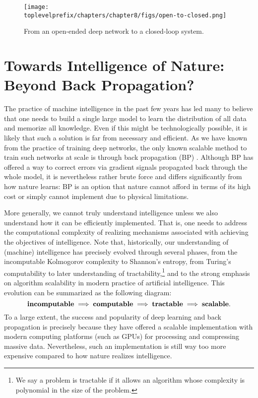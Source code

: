 \documentclass[\toplevelprefix/book-main.tex]{subfiles}
\begin{document}
\begin{figure}[t]
    \centering    
    \texttt{[image: \\toplevelprefix/chapters/chapter8/figs/open-to-closed.png]}
    \caption{From an open-ended deep network to a closed-loop system.}
    \label{fig:open-to-closed}
\end{figure}



\section{Towards Intelligence of Nature: Beyond Back Propagation?}
The practice of machine intelligence in the past few years has led many to believe that one needs to build a single large model to learn the distribution of all data and memorize all knowledge. Even if this might be technologically possible, it is likely that such a solution is far from necessary and efficient. As we have known from the practice of training deep networks, the only known scalable method to train such networks at scale is through back propagation (BP) \cite{Back-Prop}. Although BP has offered a way to correct errors via gradient signals propagated back through the whole model, it is nevertheless rather brute force and differs significantly from how nature learns: BP is an option that nature cannot afford in terms of its high cost or simply cannot implement due to physical limitations. 

More generally, we cannot truly understand intelligence unless we also understand how it can be efficiently implemented. That is, one needs to address the computational complexity of realizing mechanisms associated with achieving the objectives of intelligence. Note that, historically, our understanding of (machine) intelligence has precisely evolved through several phases, from the incomputable Kolmogorov complexity to Shannon's entropy, from Turing's computability to later understanding of  tractability,\footnote{We say a problem is tractable if it allows an algorithm whose complexity is polynomial in the size of the problem.} and to the strong emphasis on algorithm scalability in modern practice of artificial intelligence. This evolution can be summarized as the following diagram:
\begin{equation}
   \mbox{\textbf{incomputable}} \;
   \Longrightarrow \; \mbox{\textbf{computable}} \;
   \Longrightarrow \; \mbox{\textbf{tractable}} \; \Longrightarrow \; 
   \mbox{\textbf{scalable}}.
\end{equation}
To a large extent, the success and popularity of deep learning and back propagation is precisely because they have offered a  scalable implementation with modern computing platforms (such as GPUs) for processing and compressing massive data. Nevertheless, such an implementation is still way too more expensive compared to how nature realizes intelligence. 
\end{document}
